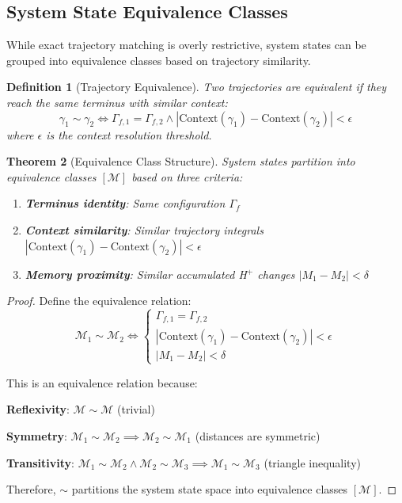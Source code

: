 \documentclass[aps,prd,twocolumn,superscriptaddress,floatfix,nofootinbib]{revtex4-2}
\newtheorem{theorem}{Theorem}[section]
\newtheorem{definition}[theorem]{Definition}
\theoremstyle{remark}
\begin{document}
\subsection{System State Equivalence Classes}

While exact trajectory matching is overly restrictive, system states can be grouped into equivalence classes based on trajectory similarity.

\begin{definition}[Trajectory Equivalence]
\label{def:trajectory_equivalence}
Two trajectories are equivalent if they reach the same terminus with similar context:
\begin{equation}
\gamma_1 \sim \gamma_2 \iff \Gamma_{f,1} = \Gamma_{f,2} \land |\text{Context}(\gamma_1) - \text{Context}(\gamma_2)| < \epsilon
\end{equation}
where $\epsilon$ is the context resolution threshold.
\end{definition}

\begin{theorem}[Equivalence Class Structure]
\label{thm:equivalence_classes}
System states partition into equivalence classes $[\mathcal{M}]$ based on three criteria:
\begin{enumerate}
\item \textbf{Terminus identity}: Same configuration $\Gamma_f$
\item \textbf{Context similarity}: Similar trajectory integrals $|\text{Context}(\gamma_1) - \text{Context}(\gamma_2)| < \epsilon$
\item \textbf{Memory proximity}: Similar accumulated H$^+$ changes $|M_1 - M_2| < \delta$
\end{enumerate}
\end{theorem}

\begin{proof}
Define the equivalence relation:
$$
\mathcal{M}_1 \sim \mathcal{M}_2 \iff \begin{cases}
\Gamma_{f,1} = \Gamma_{f,2} \\
|\text{Context}(\gamma_1) - \text{Context}(\gamma_2)| < \epsilon \\
|M_1 - M_2| < \delta
\end{cases}
$$

This is an equivalence relation because:

\textbf{Reflexivity}: $\mathcal{M} \sim \mathcal{M}$ (trivial)

\textbf{Symmetry}: $\mathcal{M}_1 \sim \mathcal{M}_2 \implies \mathcal{M}_2 \sim \mathcal{M}_1$ (distances are symmetric)

\textbf{Transitivity}: $\mathcal{M}_1 \sim \mathcal{M}_2 \land \mathcal{M}_2 \sim \mathcal{M}_3 \implies \mathcal{M}_1 \sim \mathcal{M}_3$ (triangle inequality)

Therefore, $\sim$ partitions the system state space into equivalence classes $[\mathcal{M}]$.
\end{proof}
\end{document}
